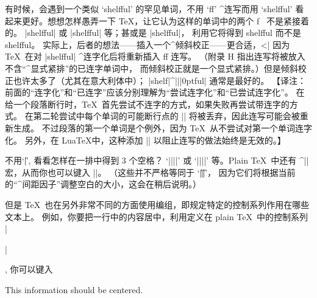 \exercise 有时候，会遇到一个类似 `shelfful' 的罕见单词，不用 `ff' ^{连写}而用%
`shelf{}ful' 看起来更好。想想怎样愚弄一下 \TeX ，让它认为这样的单词中的两个 f~%
不是紧接着的。
\answer |{shelf}ful| 或 |shelf{}ful| 等；甚或是 |shelf\/ful|，
利用它将得到 shelf\/ful 而不是 shelf{\kern0pt}ful。
实际上，后者的想法——插入一个^{倾斜校正}——更合适，^^|\/|
因为 \TeX\ 在对 |shelf{}ful| ^{连字化}后将重新插入 ff 连写。%
（附录 H 指出连写将被放入不含``^{显式紧排}''的已连字单词中，
而倾斜校正就是一个显式紧排。）但是倾斜校正也许太多了（尤其在意大利体中）；
|shelf{|^|\kern||0pt}ful| 通常是最好的。%
【译注：前面的“连字化”和“已连字”应该分别理解为“尝试连字化”和“已尝试连字化”。
在给一个段落断行时，\TeX\ 首先尝试不连字的方式，如果失败再尝试带连字的方式。
在第二轮尝试中每个单词的可能断行点的 |{}| 将被丢弃，因此连写可能会被重新生成。
不过段落的第一个单词是个例外，因为 \TeX\ 从不尝试对第一个单词连字化。
另外，在 Lua\TeX 中，这种添加 |{}| 以阻止连写的做法始终是无效的。】

\dangerexercise 不用`|\|\]', 看看怎样在一排中得到 3 个空格？
\answer `\]|{|\]|}|\]' 或 `\]|{}|\]|{}|\]' 等。Plain \TeX\ 中还有
^|\space| 宏，从而你也可以键入 |\space\space\space|。
（这些并不严格等同于 `|\|\]|\|\]|\|\]'，
因为它们将根据当前的``^{间距因子}''调整空白的大小，这会在稍后说明。）

\1但是 \TeX\ 也在另外非常不同的方面使用编组，即规定特定的控制系列作用在哪些文本上。%
例如，你要把一行中的内容居中，利用定义在 plain \TeX\ 中的控制系列 |\centerline|,
你可以键入
\begintt
\centerline{This information should be centered.}
\endtt

